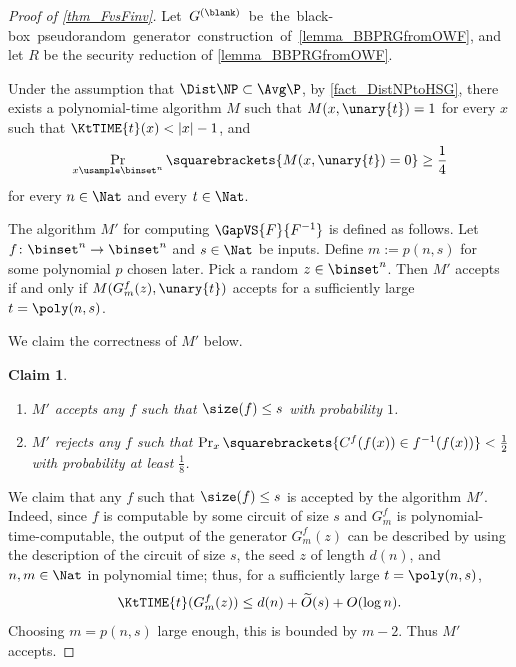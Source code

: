 \documentclass[11pt]{article}
\numberwithin{equation}{section}
\newtheorem{claim}[theorem]{Claim}
\theoremstyle{definition}
\theoremstyle{plain}
\begin{document}
\begin{proof}
  [Proof of \cref{thm_FvsFinv}]  %
%
 \quad Let\ $G^{(\blank)}$\ be\ the\ black-box\ pseudorandom\ generator\
 construction\ of\ \cref{lemma_BBPRGfromOWF},
  and let $R$ be the security reduction of \cref{lemma_BBPRGfromOWF}.

  Under the assumption that $\Dist\NP \subset \Avg\P$,
  by \cref{fact_DistNPtoHSG},
  there exists a polynomial-time algorithm $M$ such that
  $M(x, \unary{t}) = 1$ for every $x$ such that $\KtTIME{t}(x) < |x| - 1$, and
  \[ \Pr_{x \usample \binset^n} \squarebrackets{ M(x, \unary{t}) = 0}
    \ge \frac{1}{4} \]
  for every $n \in \Nat$ and every $t \in \Nat$.

  The algorithm $M'$ for computing $\GapVS{F}{F^{-1}}$ is defined as follows.
  Let $f \colon \binset^n \to \binset^n$ and $s \in \Nat$ be inputs.
  Define $m := p(n, s)$ for some polynomial $p$ chosen later.
  Pick a random $z \in \binset^n$.
  Then
  $M'$ accepts if and only if
  $M(G_{m}^{f}(z), \unary{t})$ accepts for a sufficiently large $t = \poly(n, s)$.

  We claim the correctness of $M'$ below.
  \begin{claim}
    \hspace{0em}
    \begin{enumerate}
      \item
            $M'$ accepts
            any $f$ such that $\size(f) \le s$
            with probability $1$.
      \item
            $M'$ rejects
            any $f$ such that $\Pr_x \squarebrackets{ C^f(f(x)) \in f^{-1}(f(x)) } < \frac{1}{2}$
            with probability at least $\frac{1}{8}$.
    \end{enumerate}
  \end{claim}

  We claim that any $f$ such that $\size(f) \le s$ is accepted by the algorithm $M'$.
  Indeed,
  since $f$ is computable by some circuit of size $s$ and $G_{m}^f$ is polynomial-time-computable,
  the output of the generator $G_{m}^f(z)$ can be described
  by using
  the description of the circuit of size $s$, the seed $z$ of length $d(n)$, and $n, m \in \Nat$ in polynomial time;
  thus, for a sufficiently large $t = \poly(n, s)$,
  $$
    \KtTIME{t}(G_{m}^f(z)) \le d(n) + \widetilde{O}(s) + O(\log n).
  $$
  Choosing $m = p(n, s)$ large enough, this is bounded by $m - 2$.
  Thus $M'$ accepts.


\end{proof}
\end{document}
